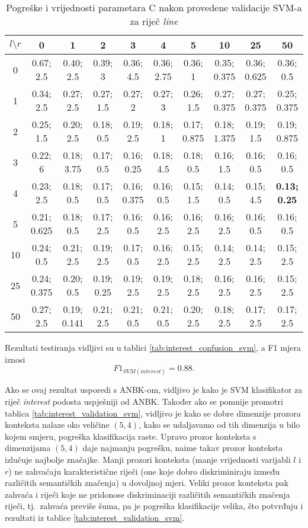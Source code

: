 \documentclass[10pt, a4paper]{article}
\begin{document}
\begin{table*}[!hbtp]
\caption{Pogreške i vrijednosti parametara C nakon provedene validacije SVM-a za riječ \emph{line}}
\label{tab:line_validation_svm}
\begin{center}
\begin{tabular}{|c|ccccccccc|}
\hline
$l \setminus r$ & 0 & 1 & 2 & 3 & 4 & 5 & 10 & 25 & 50 \\
\hline
0 & 0.67; 2.5 & 0.40; 2.5 & 0.39; 3 & 0.36; 4.5 & 0.36; 2.75 & 0.36; 1 & 0.35; 0.375 & 0.36; 0.625 & 0.36; 0.5 \\
1 & 0.34; 2.5 & 0.27; 2.5 & 0.27; 1.5 & 0.27; 2 & 0.27; 3 & 0.26; 1.5 & 0.27; 0.375 & 0.27; 0.375 & 0.25; 0.375 \\
2 & 0.25; 1.5 & 0.20; 2.5 & 0.18; 0.5 & 0.19; 2.5 & 0.18; 1 & 0.17; 0.875 & 0.18; 1.375 & 0.19; 1.5 & 0.19; 0.875 \\
3 & 0.22; 6 & 0.18; 3.75 & 0.17; 0.5 & 0.16; 0.25 & 0.18; 4.5 & 0.18; 0.5 & 0.16; 1.5 & 0.16; 0.5 & 0.16; 0.5 \\
4 & 0.23; 2.5 & 0.18; 0.5 & 0.17; 0.5 & 0.16; 0.375 & 0.16; 0.5 & 0.15; 1.5 & 0.14; 0.5 & 0.15; 4.5 & \textbf{0.13; 0.25} \\
5 & 0.21; 0.625 & 0.18; 0.5 & 0.17; 2.5 & 0.16; 0.5 & 0.16; 2.5 & 0.16; 2.5 & 0.16; 2.5 & 0.16; 0.5 & 0.16; 0.5 \\
10 & 0.24; 0.5 & 0.21; 2.5 & 0.19; 2.5 & 0.17; 0.5 & 0.16; 2.5 & 0.15; 2.5 & 0.14; 2.5 & 0.14; 2.5 & 0.15; 2.5 \\
25 & 0.24; 0.375 & 0.20; 0.5 & 0.19; 0.25 & 0.19; 2.5 & 0.19; 2.5 & 0.18; 2.5 & 0.16; 2.5 & 0.16; 2.5 & 0.15; 2.5 \\
50 & 0.27; 2.5 & 0.19; 0.141 & 0.21; 2.5 & 0.21; 0.5 & 0.21; 0.5 & 0.20; 2.5 & 0.18; 2.5 & 0.17; 2.5 & 0.17; 2.5 \\
\hline
\end{tabular}
\end{center}
\end{table*}
Rezultati testiranja vidljivi su u tablici \ref{tab:interest_confusion_svm},
a F1 mjera iznosi
\begin{equation}
\label{eq:f1_svm_interest}
F1_{SVM(interest)} = 0.88.
\end{equation}

Ako se ovaj rezultat usporedi s ANBK-om, vidljivo je kako je SVM klasifikator za riječ \emph{interest} podosta uspješniji od ANBK.
Također ako se pomnije promotri tablica \ref{tab:interest_validation_svm}, vidljivo je kako se dobre dimenzije
prozora konteksta nalaze oko veličine $(5,4)$, 
kako se udaljavamo od tih dimenzija u bilo kojem smjeru, pogreška klasifikacija raste.
Upravo prozor konteksta s dimenzijama $(5, 4)$ daje najmanju pogrešku,
naime takav prozor konteksta izlučuje najbolje značajke.
Manji prozori konteksta (manje vrijednosti varijabli $l$ i $r$) 
ne zahvaćaju karakteristične riječi (one koje dobro diskriminiraju između različitih semantičkih značenja) u dovoljnoj mjeri.
Veliki prozor konteksta pak zahvaća i riječi koje ne pridonose diskriminaciji
različitih semantičkih značenja riječi, tj.~zahvaća previše šuma, pa je
pogreška klasifikacije velika, što potvrđuju i rezultati iz tablice \ref{tab:interest_validation_svm}.
\end{document}
